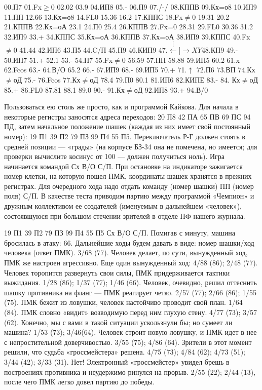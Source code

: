 \documentclass[11pt,a4paper,oneside]{article}
\def\XY{$\stackrel[\leftarrow]{\rightarrow}{XY}$}
\begin{document}
00.П7 01.Fx$\geq$0 02.02 03.9 04.ИП8 05.- 06.П9 07./-/ 08.КППВ 09.Кх=о8 10.ИП9 11.ПП 12.66 13.Кх=о8 14.FL0 15.36
16.2 17.КППС 18.Fx$\neq$0 19.31 20.2 21.КППВ 22.Кх=оА 23.1 24.П0 25.4
26.КППВ 27.Fx=0 28.31 29.FL0 30.36
31.2 32.ИП9 33.+ 34.КППС 35.Кх=оА 36.КППВ 37.Кх=оА 38.ИП9 39.КППС
40.Fx$\neq$0 41.44 42.ИП6 43.П5 44.C/П
45.П9 46.КИП9 47.\XY 48.КП9 49.- 50.ИП7 51.+ 52.1 53.- 54.П7 55.Fx$\neq$0 56.59 57.ПП 58.88 59.ИП5 60.2 61.x 62.Fcos 63.- 64.В/О 65.2 66.- 67.ИП9 68.- 69.ИП5 70.+ 71.$\uparrow$ 72.П6 73.ВП 74.Кх$\neq$оД 75.- 76.Fcos 77.Кх$\neq$оД 78.4 79.П0 80.1 81.ИП6 82.КИПЕ 83.-
84. Кх$\neq$оД 85.+ 86.FL0 87.81 88.1 89.0 90.- 91.Кх$\neq$оД 92.ИП8 93.+ 94.В/0

Пользоваться ею столь же просто, как и программой Кайкова. Для начала в некоторые регистры заносятся адреса переходов: 20 П8 42 ПА 65 ПВ 69 ПС 94 ПД, затем начальное положение шашек (каждая из них имеет свой постоянный номер): 19 П1 39 П2 79 ПЗ 99 П4 55 П5. Переключатель Р-Г должен стоять в средней позиции — «грады» (на корпусе БЗ-34 она не помечена, но имеется; для проверки вычислите косинус от 100 — должен получиться ноль). Игра начинается командой Сх В/О С/П. При остановке на индикаторе зажигается номер клетки, на которую пошел ПМК, координаты шашек хранятся в прежних регистрах. Для очередного хода надо отдать команду (номер шашки) ПП (номер поля) С/П. В качестве теста приводим партию между программой «Чемпион» и дружным коллективом ее создателей (именуемым в дальнейшем «человек»), состоявшуюся при большом стечении зрителей в отделе НФ нашего журнала.

19 П1 39 П2 79 ПЗ 99 П4 55 П5 Сх В/О С/П. Помигав с минуту, машина бросилась в атаку: 66. Дальнейшие ходы будем давать в виде: номер шашки/ход человека (ответ ПМК). 3/68 (77). Человек делает, по сути, вынужденный ход, ПМК же настроен агрессивно. Еще один вынужденный ход: 4/88 (86); 2/48 (77). Человек торопится развернуть свои силы, ПМК придерживается тактики выжидания. 1/28 (86); 1/37 (77); 1/46 (66). Человек, очевидно, решил оттеснить шашку противника на фланг — ПМК реагирует четко. 2/57 (77); 2/66 (86); 1/55 (75). ПМК бежит из ловушки, человек настойчиво проводит свой план. 1/64 (84). ПМК словно «видит» возводимую перед ним глухую стену. 4/77 (73); 3/57 (62). Конечно, мы с вами в такой ситуации ускользнули бы; но сумеет ли машина? 1/53 (73); 3/46(64). Человек строит новую ловушку, и ПМК идет в нее с непростительной доверчивостью. 3/55 (75); 4/86 (64). Зрители в этот момент решили, что судьба «гроссмейстера» решена. 4/75 (73); 4/84 (62); 4/73 (51); 3/44 (42); 3/33 (31). Нет! Электронный «гроссмейстер» увидел брешь в построениях противника и неудержимо ринулся на прорыв. 2/55 (22); 2/44 (13), после чего ПМК легко довел партию до победы.
\end{document}
